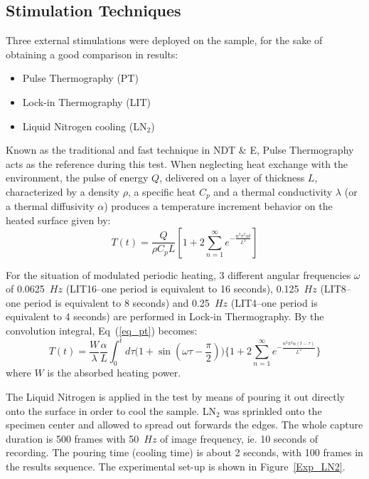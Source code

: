 \documentclass[]{spie}  %
\begin{document}
\subsection{Stimulation Techniques} %
\label{sub:stimulation_techniques}
Three external stimulations were deployed on the sample, for the sake of  obtaining a good comparison in results: 
\begin{itemize}
   \item Pulse Thermography (PT) 
   \item Lock-in Thermography (LIT)
   \item Liquid Nitrogen cooling (LN$_2$)
\end{itemize}
Known as the traditional and fast technique in NDT \& E, Pulse Thermography acts as the reference during this test. When neglecting heat exchange with the environment, the pulse of energy $Q$, delivered on a layer of thickness $L$, characterized by a density $\rho$, a specific heat $C_p$ and a thermal conductivity $\lambda$ (or a thermal diffusivity $\alpha$) produces a temperature increment behavior on the heated surface given by:
\begin{equation}
   T(t) = \frac{Q}{\rho C_p L}[1+2\sum_{n=1}^{\infty} e^{-\frac{n^2 \pi ^2\alpha t}{L^2}}]
   \label{eq_pt}
\end{equation}

For the situation of modulated periodic heating, 3 different angular frequencies $\omega$ of 0.0625~$Hz$ (LIT16--one period is equivalent to 16 seconds), 0.125~$Hz$ (LIT8--one period is equivalent to 8 seconds) and 0.25~$Hz$ (LIT4--one period is equivalent to 4 seconds) are performed in Lock-in Thermography. 
By the convolution integral, Eq~(\ref{eq_pt}) becomes:
\begin{equation}
   T(t) = \frac{W}{\lambda}\frac{\alpha}{L}\int_0^t d\tau \Big(1+\sin(\omega \tau - \frac{\pi}{2})\Big)\Big\{1+2\sum_{n=1}^{\infty} e^{-\frac{n^2 \pi ^2\alpha(t-\tau)}{L^2}}\Big\}
\end{equation}
where $W$ is the absorbed heating power.

The Liquid Nitrogen is applied in the test by means of pouring it out directly onto the surface in order to cool the sample. LN$_2$ was sprinkled onto the specimen center and allowed to spread out forwards the edges. The whole capture duration is 500 frames with 50~$Hz$ of image frequency, ie. 10 seconds of recording. The pouring time (cooling time) is about 2 seconds, with 100 frames in the results sequence. The experimental set-up is shown in Figure~\ref{Exp_LN2}.
\end{document}
